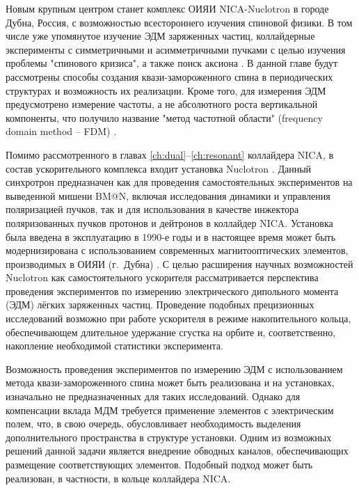 \par Новым крупным центром станет комплекс ОИЯИ NICA-Nuclotron в городе Дубна, Россия, с возможностью всестороннего изучения спиновой физики. В том числе уже упомянутое изучение ЭДМ заряженных частиц, коллайдерные эксперименты с симметричными и асимметричными пучками с целью изучения проблемы "спинового кризиса"\cite{ST_Filatov}, а также поиск аксиона \cite{Axion_Nikolaev}. В данной главе будут рассмотрены способы создания квази-замороженного спина в периодических структурах и возможность их реализации. Кроме того, для измерения ЭДМ предусмотрено измерение частоты, а не абсолютного роста вертикальной компоненты, что получило название "метод частотной области" (frequency domain method -- FDM) \cite{FDM}.

\par Помимо рассмотренного в главах \ref{ch:dual}–\ref{ch:resonant} коллайдера NICA, в состав ускорительного комплекса входит установка Nuclotron \cite{nuclotron24}. Данный синхротрон предназначен как для проведения самостоятельных экспериментов на выведенной мишени BM@N, включая исследования динамики и управления поляризацией пучков, так и для использования в качестве инжектора поляризованных пучков протонов и дейтронов в коллайдер NICA. Установка была введена в эксплуатацию в 1990-е годы \cite{baldin:nuclotron} и в настоящее время может быть модернизирована с использованием современных магнитооптических элементов, производимых в ОИЯИ (г.~Дубна) \cite{korovkin:nica_magnets}. С целью расширения научных возможностей Nuclotron как самостоятельного ускорителя рассматривается перспектива проведения экспериментов по измерению электрического дипольного момента (ЭДМ) лёгких заряженных частиц. Проведение подобных прецизионных исследований возможно при работе ускорителя в режиме накопительного кольца, обеспечивающем длительное удержание сгустка на орбите и, соответственно, накопление необходимой статистики эксперимента. 

\par Возможность проведения экспериментов по измерению ЭДМ с использованием метода квази-замороженного спина может быть реализована и на установках, изначально не предназначенных для таких исследований. Однако для компенсации вклада МДМ требуется применение элементов с электрическим полем, что, в свою очередь, обусловливает необходимость выделения дополнительного пространства в структуре установки. Одним из возможных решений данной задачи является внедрение обводных каналов, обеспечивающих размещение соответствующих элементов. Подобный подход может быть реализован, в частности, в кольце коллайдера NICA.

